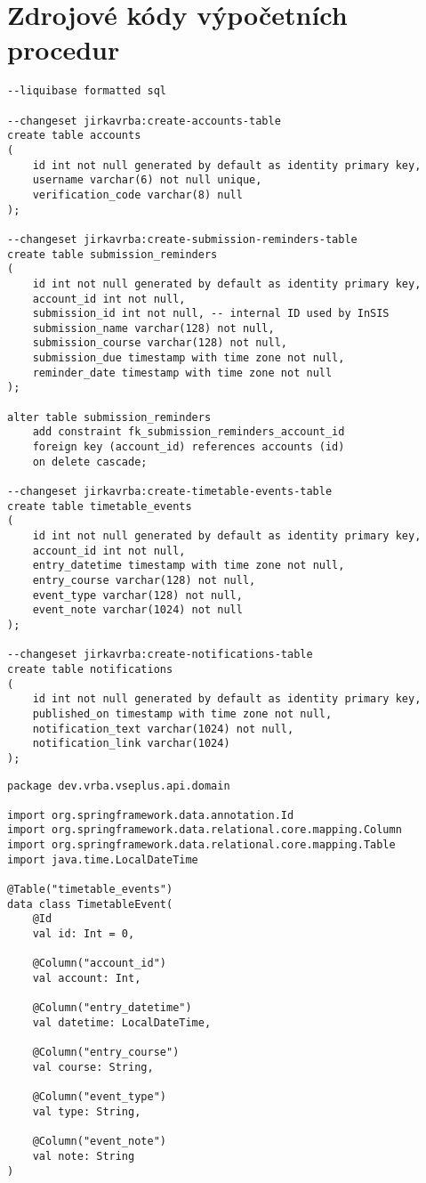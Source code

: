 \chapter{Zdrojové kódy výpočetních procedur}

\begin{lstlisting}[label={code:liquibase-changelog}, caption={SQL soubor s~migracemi pro nástroj Liquibase (vlastní zpracování)}]
--liquibase formatted sql

--changeset jirkavrba:create-accounts-table
create table accounts
(
    id int not null generated by default as identity primary key,
    username varchar(6) not null unique,
    verification_code varchar(8) null
);

--changeset jirkavrba:create-submission-reminders-table
create table submission_reminders
(
    id int not null generated by default as identity primary key,
    account_id int not null,
    submission_id int not null, -- internal ID used by InSIS
    submission_name varchar(128) not null,
    submission_course varchar(128) not null,
    submission_due timestamp with time zone not null,
    reminder_date timestamp with time zone not null
);

alter table submission_reminders
    add constraint fk_submission_reminders_account_id 
    foreign key (account_id) references accounts (id) 
    on delete cascade;

--changeset jirkavrba:create-timetable-events-table
create table timetable_events
(
    id int not null generated by default as identity primary key,
    account_id int not null,
    entry_datetime timestamp with time zone not null,
    entry_course varchar(128) not null,
    event_type varchar(128) not null,
    event_note varchar(1024) not null
);

--changeset jirkavrba:create-notifications-table
create table notifications
(
    id int not null generated by default as identity primary key,
    published_on timestamp with time zone not null,
    notification_text varchar(1024) not null,
    notification_link varchar(1024)
);
\end{lstlisting}

\begin{lstlisting}[label={code:timetable-event-domain-class}, caption={Zdrojový kód doménové třídy \code{TimetableEvent}}]
package dev.vrba.vseplus.api.domain

import org.springframework.data.annotation.Id
import org.springframework.data.relational.core.mapping.Column
import org.springframework.data.relational.core.mapping.Table
import java.time.LocalDateTime

@Table("timetable_events")
data class TimetableEvent(
    @Id
    val id: Int = 0,

    @Column("account_id")
    val account: Int,

    @Column("entry_datetime")
    val datetime: LocalDateTime,

    @Column("entry_course")
    val course: String,

    @Column("event_type")
    val type: String,

    @Column("event_note")
    val note: String
)
\end{lstlisting}

